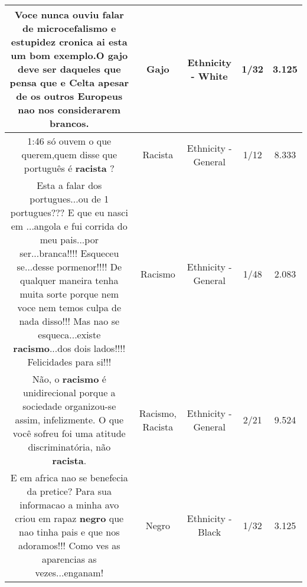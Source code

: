 \documentclass[11pt]{article}
\newlength\mylength
\begin{document}
\begin{center}
\begin{longtable}{|C{.65\mylength}|C{.30\mylength}|C{.12\mylength}|C{.12\mylength}|C{.12\mylength}|}
  \small Voce nunca ouviu falar de microcefalismo e estupidez cronica ai esta um bom exemplo.O \textbf{gajo} deve ser daqueles que pensa que e Celta apesar de os outros Europeus nao nos considerarem brancos.\normalsize   & Gajo & Ethnicity - White & 1/32 & 3.125 \\  \hline
  \small 1:46 só ouvem o que querem,quem disse que português é \textbf{racista} ?\normalsize   & Racista & Ethnicity - General & 1/12 & 8.333 \\  \hline
  \small Esta a falar dos portugues...ou de 1 portugues??? E que eu nasci em ...angola e fui corrida do meu pais...por ser...branca!!!! Esqueceu se...desse pormenor!!!! De qualquer maneira tenha muita sorte porque nem voce nem temos culpa de nada disso!!! Mas nao se esqueca...existe \textbf{racismo}...dos dois lados!!!! Felicidades para si!!!\normalsize   & Racismo & Ethnicity - General & 1/48 & 2.083 \\  \hline
  \small Não, o \textbf{racismo} é unidirecional porque a sociedade organizou-se assim, infelizmente. O que você sofreu foi uma atitude discriminatória, não \textbf{racista}.\normalsize   & Racismo, Racista & Ethnicity - General & 2/21 & 9.524 \\  \hline
  \small E em africa nao se benefecia da pretice? Para sua informacao a minha avo criou em rapaz \textbf{negro} que nao tinha pais e que nos adoramos!!! Como ves as aparencias as vezes...enganam!\normalsize   & Negro & Ethnicity - Black & 1/32 & 3.125 \\  \hline

\end{longtable}
\end{center}
\end{document}

